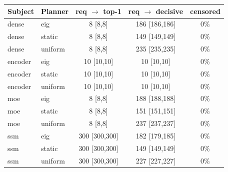 \begin{tabular}{@{}l l c c c@{}}
\toprule
\textbf{Subject} & \textbf{Planner} & \textbf{req $\to$ top-1} & \textbf{req $\to$ decisive} & \textbf{censored}\\
\midrule
dense & eig & 8 [8,8] & 186 [186,186] & 0\% \\
dense & static & 8 [8,8] & 149 [149,149] & 0\% \\
dense & uniform & 8 [8,8] & 235 [235,235] & 0\% \\
encoder & eig & 10 [10,10] & 10 [10,10] & 0\% \\
encoder & static & 10 [10,10] & 10 [10,10] & 0\% \\
encoder & uniform & 10 [10,10] & 10 [10,10] & 0\% \\
moe & eig & 8 [8,8] & 188 [188,188] & 0\% \\
moe & static & 8 [8,8] & 151 [151,151] & 0\% \\
moe & uniform & 8 [8,8] & 237 [237,237] & 0\% \\
ssm & eig & 300 [300,300] & 182 [179,185] & 0\% \\
ssm & static & 300 [300,300] & 149 [149,149] & 0\% \\
ssm & uniform & 300 [300,300] & 227 [227,227] & 0\% \\
\bottomrule
\end{tabular}
